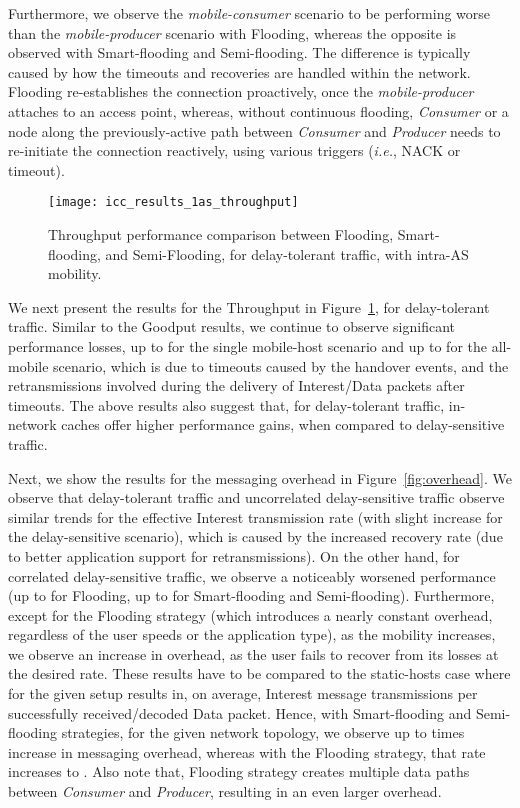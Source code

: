 \documentclass[conference]{IEEEtran}
\begin{document}
Furthermore, we observe the \emph{mobile-consumer} scenario to be performing worse than the \emph{mobile-producer} scenario with Flooding, whereas the opposite is observed with Smart-flooding and Semi-flooding. The difference is typically caused by how the timeouts and recoveries are handled within the network. Flooding re-establishes the connection proactively, once the \emph{mobile-producer} attaches to an access point, whereas, without continuous flooding, \emph{Consumer} or a node along the previously-active path between \emph{Consumer} and \emph{Producer} needs to re-initiate the connection reactively, using various triggers (\emph{i.e.}, NACK or timeout). 
\begin{figure}[htb]
  \centering
\texttt{[image: icc\_results\_1as\_throughput]}\\
  \caption{Throughput performance comparison between Flooding, Smart-flooding, and Semi-Flooding, for delay-tolerant traffic, with intra-AS mobility.}\label{ThroughputResults}
\end{figure}

We next present the results for the Throughput in Figure~\ref{ThroughputResults}, for delay-tolerant traffic. Similar to the Goodput results, we continue to observe significant performance losses, up to  for the single mobile-host scenario and up to  for the all-mobile scenario, which is due to timeouts caused by the handover events, and the retransmissions involved during the delivery of Interest/Data packets after timeouts. The above results also suggest that, for delay-tolerant traffic, in-network caches offer higher performance gains, when compared to delay-sensitive traffic.




Next, we show the results for the messaging overhead in Figure~\ref{fig:overhead}. We observe that delay-tolerant traffic and uncorrelated delay-sensitive traffic observe similar trends for the effective Interest transmission rate (with slight increase for the delay-sensitive scenario), which is caused by the increased recovery rate (due to better application support for retransmissions). On the other hand, for correlated delay-sensitive traffic, we observe a noticeably worsened performance (up to  for Flooding, up to  for Smart-flooding and Semi-flooding). Furthermore, except for the Flooding strategy (which introduces a nearly constant overhead, regardless of the user speeds or the application type), as the mobility increases, we observe an increase in overhead, as the user fails to recover from its losses at the desired rate. These results have to be compared to the static-hosts case where for the given setup results in, on average,  Interest message transmissions per successfully received/decoded Data packet. Hence, with Smart-flooding and Semi-flooding strategies, for the given network topology, we observe up to  times increase in messaging overhead, whereas with the Flooding strategy, that rate increases to . Also note that, Flooding strategy creates multiple data paths between \emph{Consumer} and \emph{Producer}, resulting in an even larger overhead.
\end{document}
